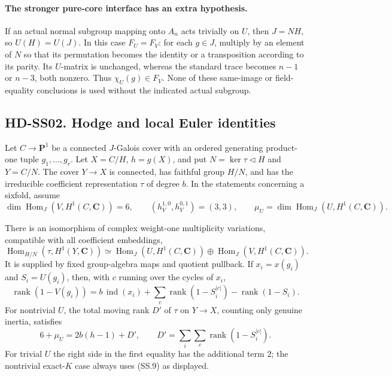 \paragraph{The stronger pure-core interface has an extra hypothesis.}
If an actual normal subgroup mapping onto $A_n$ acts trivially on
$U$, then $J=NH$, so $U(H)=U(J)$.  In this case $F_U=F_V$:
for each $g\in J$, multiply by an element of $N$ so that its
permutation becomes the identity or a transposition according
to its parity.  Its $U$-matrix is unchanged, whereas the standard
trace becomes $n-1$ or $n-3$, both nonzero.  Thus
$\chi_U(g)\in F_V$.  None of these same-image or field-equality
conclusions is used without the indicated actual subgroup.

\subsection*{HD-SS02. Hodge and local Euler identities}

Let $C\to\mathbf P^1$ be a connected $J$-Galois cover with an
ordered generating product-one tuple $g_1,\ldots,g_r$.
Let $X=C/H$, $h=g(X)$, and put $N=\ker\tau\lhd H$ and $Y=C/N$.
The cover $Y\to X$ is connected, has faithful group $H/N$, and
has the irreducible coefficient representation $\tau$ of degree $b$.
In the statements concerning a sixfold, assume
\[
 \dim\operatorname{Hom}_J(V,H^1(C,\mathbf C))=6,
 \qquad (h^{1,0}_V,h^{0,1}_V)=(3,3),
 \qquad \mu_U=\dim\operatorname{Hom}_J(U,H^1(C,\mathbf C)).
 \tag{SS.6}
\]

\begin{proposition}[HD-SS02]
There is an isomorphism of complex weight-one multiplicity
variations, compatible with all coefficient embeddings,
\[
 \operatorname{Hom}_{H/N}(\tau,H^1(Y,\mathbf C))
 \simeq
 \operatorname{Hom}_J(U,H^1(C,\mathbf C))
 \oplus\operatorname{Hom}_J(V,H^1(C,\mathbf C)).
 \tag{SS.7}
\]
It is supplied by fixed group-algebra maps and quotient pullback.
If $x_i=x(g_i)$ and $S_i=U(g_i)$, then, with $c$ running over
the cycles of $x_i$,
\[
 \operatorname{rank}(1-V(g_i))
  =b\,\operatorname{ind}(x_i)
     +\sum_c\operatorname{rank}(1-S_i^{|c|})
     -\operatorname{rank}(1-S_i).
 \tag{SS.8}
\]
For nontrivial $U$, the total moving rank $D'$ of $\tau$ on
$Y\to X$, counting only genuine inertia, satisfies
\[
               6+\mu_U=2b(h-1)+D',
 \qquad D'=\sum_i\sum_c\operatorname{rank}(1-S_i^{|c|}).
 \tag{SS.9}
\]
For trivial $U$ the right side in the first equality has the
additional term $2$; the nontrivial exact-$K$ case always uses
(SS.9) as displayed.
\end{proposition}

